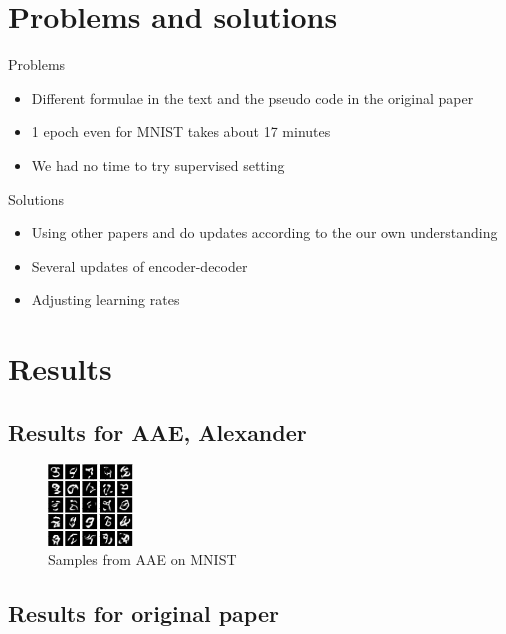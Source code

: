 \documentclass{article}
\begin{document}
    \section{Problems and solutions}
    Problems
    \begin{itemize}
        \item Different formulae in the text and the pseudo code in the original paper
        \item 1 epoch even for MNIST takes about 17 minutes
        \item We had no time to try supervised setting
    \end{itemize}
    Solutions
    \begin{itemize}
        \item Using other papers and do updates according to the our own understanding
        \item Several updates of encoder-decoder
        \item Adjusting learning rates
    \end{itemize}
    \section{Results}
    \subsection{Results for AAE, Alexander}
    \begin{center}
        \begin{figure}[H]
            \centering
            \includegraphics[width=0.2\textwidth]{figures/aae_epoch100.png}
            \caption{Samples from AAE on MNIST}
        \end{figure}
    \end{center}
    \subsection{Results for original paper}
\end{document}
